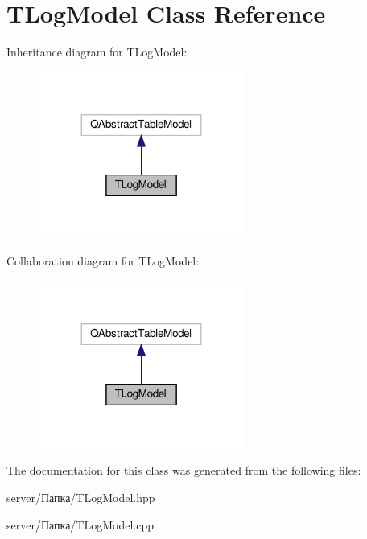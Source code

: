 \hypertarget{class_t_log_model}{}\section{T\+Log\+Model Class Reference}
\label{class_t_log_model}


Inheritance diagram for T\+Log\+Model\+:\nopagebreak
\begin{figure}[H]
\begin{center}
\leavevmode
\includegraphics[width=191pt]{class_t_log_model__inherit__graph}
\end{center}
\end{figure}


Collaboration diagram for T\+Log\+Model\+:\nopagebreak
\begin{figure}[H]
\begin{center}
\leavevmode
\includegraphics[width=191pt]{class_t_log_model__coll__graph}
\end{center}
\end{figure}


The documentation for this class was generated from the following files\+:\begin{DoxyCompactItemize}
\item 
server/Папка/T\+Log\+Model.\+hpp\item 
server/Папка/T\+Log\+Model.\+cpp\end{DoxyCompactItemize}
